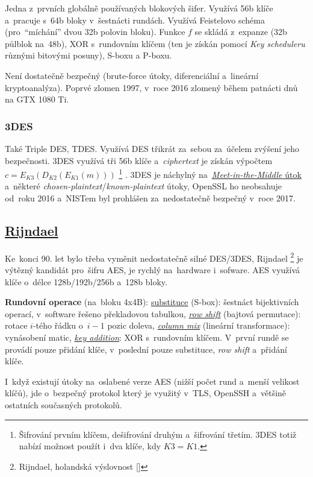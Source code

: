 Jedna z~prvních globálně používaných blokových šifer. Využívá 56b klíče a~pracuje s~64b bloky v~šestnácti rundách. Využívá Feistelovo schéma (pro~\enquote{míchání} dvou 32b polovin bloku). Funkce $f$ se skládá z~expanze (32b půlblok na~48b), XOR s~rundovním klíčem (ten je získán pomocí \emph{Key scheduleru} různými bitovými posuny), S-boxu a P-boxu.

Není dostatečně bezpečný (brute-force útoky, diferenciální a~lineární kryptoanalýza). Poprvé zlomen 1997, v~roce 2016 zlomený během patnácti dnů na GTX 1080 Ti.

\subsubsection{3DES}

Také Triple DES, TDES. Využívá DES třikrát za~sebou za~účelem zvýšení jeho bezpečnosti. 3DES využívá tři 56b klíče a~\emph{ciphertext} je získán výpočtem $c = E_{K3}(D_{K2}(E_{K1}(m)))$%
\footnote{Šifrování prvním klíčem, dešifrování druhým a~šifrování třetím. 3DES totiž nabízí možnost použít i~dva klíče, kdy $K3=K1$.}%
. 3DES je náchylný na~\href{https://en.wikipedia.org/wiki/Meet-in-the-middle_attack}{\emph{Meet-in-the-Middle} útok} a~některé \emph{chosen-plaintext}/\emph{known-plaintext} útoky, OpenSSL ho neobsahuje od~roku 2016 a~NISTem byl prohlášen za~nedostatečně bezpečný v~roce 2017.

\subsection{\href{https://en.wikipedia.org/wiki/Advanced_Encryption_Standard}{Rijndael}}

Ke~konci 90. let bylo třeba vyměnit nedostatečně silné DES/3DES, Rijndael%
\footnote{Rijndael, holandská výslovnost []}
je výtězný kandidát pro~šifru AES, je rychlý na~hardware i~sofware. AES využívá klíče o~délce 128b/192b/256b a~128b bloky.

\textbf{Rundovní operace} (na~bloku 4x4B): \underline{substituce} (S-box): šestnáct bijektivních operací, v~software řešeno překladovou tabulkou, \underline{\emph{row shift}} (bajtová permutace): rotace $i$-tého řádku o~$i-1$ pozic doleva, \underline{\emph{column mix}} (lineární transformace): vynásobení matic, \underline{\emph{key addition}}: XOR s~rundovním klíčem. V~první rundě se provádí pouze přidání klíče, v~poslední pouze substituce, \emph{row shift} a~přidání klíče.

I~když existují útoky na~oslabené verze AES (nižší počet rund a~menší velikost klíčů), jde o~bezpečný protokol který je využitý v~TLS, OpenSSH a~většině ostatních současných protokolů.

